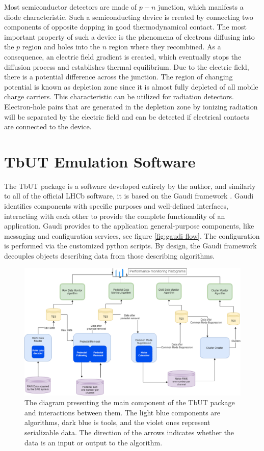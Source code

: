 Most semiconductor detectors are made of $p-n$ junction, which manifests a diode characteristic. Such a semiconducting device is created by connecting two components of opposite dopping in good thermodynamical contact. The most important property of such a device is the phenomena of electrons diffusing into the $p$ region and holes into the $n$ region where they recombined. As a consequence, an electric field gradient is created, which eventually stops the diffusion process and establishes thermal equilibrium. Due to the electric field, there is a potential difference across the junction. The region of changing potential is known as depletion zone since it is almost fully depleted of all mobile charge carriers. This characteristic can be utilized for radiation detectors. Electron-hole pairs that are generated in the depletion zone by ionizing radiation will be separated by the electric field and can be detected if electrical contacts are connected to the device.


\section{TbUT Emulation Software}
The TbUT package is a software developed entirely by the author, and similarly to all of the official LHCb software, it is based on the Gaudi framework \cite{gaudi}. Gaudi identifies components with specific purposes and well-defined interfaces, interacting with each other to provide the complete functionality of an application. Gaudi provides to the application general-purpose components, like messaging and configuration services, see figure \ref{fig:gaudi flow}. The configuration is performed via the customized python scripts. By design, the Gaudi framework decouples objects describing data from those describing algorithms.



\begin{figure}[h]
\centering
\includegraphics{figures/TBUT.png}
\caption{The diagram presenting the main component of the TbUT package and interactions between them. The light blue components are algorithms, dark blue is tools, and the violet ones represent serializable data. The direction of the arrows indicates whether the data is an input or output to the algorithm. }
\label{fig:TbUT}
\end{figure}


